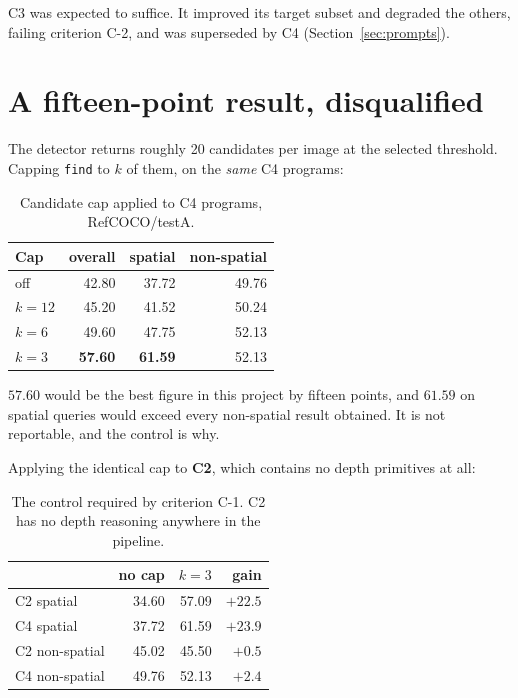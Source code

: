 \documentclass[12pt,a4paper,oneside]{report}
\newcommand{\down}[1]{\textcolor{bad}{\textbf{#1}}}
\begin{document}
C3 was expected to suffice. It improved its target subset and degraded the others,
failing criterion C-2, and was superseded by C4 (Section~\ref{sec:prompts}).

\section{A fifteen-point result, disqualified}

The detector returns roughly 20 candidates per image at the selected threshold. Capping
\texttt{find} to $k$ of them, on the \emph{same} C4 programs:

\begin{table}[htbp]\centering
\caption{Candidate cap applied to C4 programs, RefCOCO/testA.}
\label{tab:cap}
\begin{tabular}{@{}lrrr@{}}
\toprule
\textbf{Cap} & \textbf{overall} & \textbf{spatial} & \textbf{non-spatial} \\
\midrule
off & 42.80 & 37.72 & 49.76 \\
$k = 12$ & 45.20 & 41.52 & 50.24 \\
$k = 6$ & 49.60 & 47.75 & 52.13 \\
$k = 3$ & \textbf{57.60} & \textbf{61.59} & 52.13 \\
\bottomrule
\end{tabular}
\end{table}

$57.60$ would be the best figure in this project by fifteen points, and $61.59$ on spatial
queries would exceed every non-spatial result obtained. It is not reportable, and the
control is why.

Applying the identical cap to \textbf{C2}, which contains no depth primitives at all:

\begin{table}[htbp]\centering
\caption{The control required by criterion C-1. C2 has no depth reasoning anywhere in the
pipeline.}
\label{tab:capcontrol}
\begin{tabular}{@{}lrrr@{}}
\toprule
& \textbf{no cap} & \textbf{$k = 3$} & \textbf{gain} \\
\midrule
C2 spatial & 34.60 & 57.09 & \down{$+22.5$} \\
C4 spatial & 37.72 & 61.59 & $+23.9$ \\
C2 non-spatial & 45.02 & 45.50 & $+0.5$ \\
C4 non-spatial & 49.76 & 52.13 & $+2.4$ \\
\bottomrule
\end{tabular}
\end{table}
\end{document}
